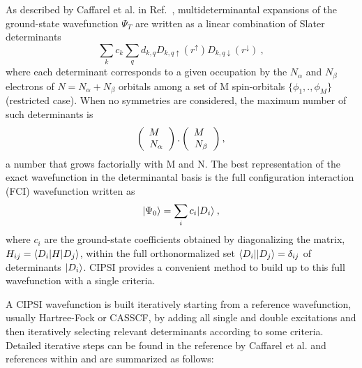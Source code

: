 As described by Caffarel et al. in Ref.~\cite{Caffarel2013},
multideterminantal expansions of the ground-state wavefunction
$\Psi_T$ are written as a linear combination of Slater determinants
\begin{equation}
\sum_k c_k \sum_q d_{k,q}D_{k,q\uparrow } (r^{\uparrow})D_{k,q\downarrow}(r^{\downarrow})\:, %
\end{equation}
  where each determinant corresponds to a given occupation by the $N_{\alpha}$ and $N_{\beta}$ electrons of $N=N_{\alpha}+N_{\beta}$ orbitals among a set of M spin-orbitals $\{\phi_1,.,\phi_M\}$ (restricted case). When no symmetries are
considered, the maximum number of such determinants is
\begin{eqnarray}
\label{eqn:Det-Permutations}
\left(
\begin{array}{c} M \hspace{1.5mm} \\ N_{\alpha}  \end{array}
\right).
\left(
\begin{array}{c} M \hspace{1.5mm} \\ N_{\beta}  \end{array}
\right),
\end{eqnarray}
a number that grows factorially with M and N. The best representation of the exact wavefunction in the determinantal basis is the full configuration interaction (FCI) wavefunction written as 
\begin{equation}
\lvert \Psi_0 \rangle=\sum_{i} c_{i} \lvert D_i \rangle\:,
\end{equation}
where $c_i$ are the ground-state coefficients obtained by
diagonalizing the matrix, $H_{ij}=\langle D_i \rvert H\lvert D_j \rangle$, within the
full orthonormalized set $\langle D_i \rvert\lvert D_j \rangle=\delta_{ij}$ of
determinants $\lvert D_i \rangle$. CIPSI provides a convenient method to build up to this full wavefunction with a single criteria.


A CIPSI wavefunction is built iteratively starting from a reference
wavefunction, usually Hartree-Fock or CASSCF, by adding all single and
double excitations and then iteratively selecting relevant
determinants according to some criteria. Detailed iterative steps can
be found in the reference by Caffarel et al. and references
within\cite{Caffarel2013, Scemama2016,Scemama2018,Garniron2017-2} and
are summarized as follows:

